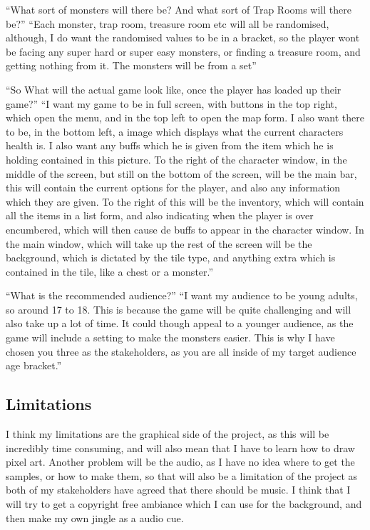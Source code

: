 \documentclass[12pt]{article}
\begin{document}
“What sort of monsters will there be? And what sort of Trap Rooms will there be?”
“Each monster, trap room, treasure room etc will all be randomised, although, I do want the randomised values to be in a bracket, so the player wont be facing any super hard or super easy monsters, or finding a treasure room, and getting nothing from it. The monsters will be from a set”

“So What will the actual game look like, once the player has loaded up their game?”
“I want my game to be in full screen, with buttons in the top right, which open the menu, and in the top left to open the map form. I also want there to be, in the bottom left, a image which displays what the current characters health is. I also want any buffs which he is given from the item which he is holding contained in this picture. To the right of the character window, in the middle of the screen, but still on the bottom of the screen, will be the main bar, this will contain the current options for the player, and also any information which they are given. To the right of this will be the inventory, which will contain all the items in a list form, and also indicating when the player is over encumbered, which will then cause de buffs to appear in the character window. In the main window, which will take up the rest of the screen will be the background, which is dictated by the tile type, and anything extra which is contained in the tile, like a chest or a monster.”

“What is the recommended audience?”
“I want my audience to be young adults, so around 17 to 18. This is because the game will be quite challenging and will also take up a lot of time. It could though appeal to a younger audience, as the game will include a setting to make the monsters easier. This is why I have chosen you three as the stakeholders, as you are all inside of my target audience age bracket.”


		\subsection{Limitations}

I think my limitations are the graphical side of the project, as this will be incredibly time consuming, and will also mean that I have to learn how to draw pixel art. Another problem will be the audio, as I have no idea where to get the samples, or how to make them, so that will also be a limitation of the project as both of my stakeholders have agreed that there should be music. I think that I will try to get a copyright free ambiance which I can use for the background, and then make my own jingle as a audio cue.
\end{document}

